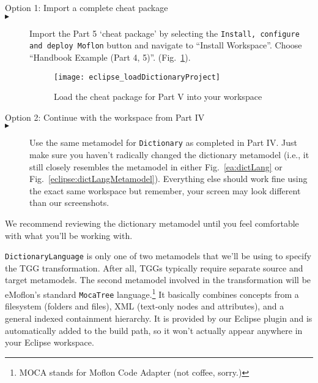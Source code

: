 \vspace{0.5cm}

\begin{description}

\item[Option 1: Import a complete cheat package]

\item[$\blacktriangleright$] \hspace{0.3cm} Import the Part 5 `cheat package' by selecting the \texttt{Install, configure and deploy Moflon} button and navigate to ``Install Workspace''. Choose ``Handbook Example (Part 4, 5)''. (Fig.~\ref{eclipse_cheatPackage}).

\begin{figure}[htbp]
\begin{center}
  \texttt{[image: eclipse\_loadDictionaryProject]}
  \caption{Load the cheat package for Part V into your workspace}
  \label{eclipse_cheatPackage}
\end{center}
\end{figure}

\vspace{0.5cm}

\item[Option 2: Continue with the workspace from Part IV]


\item[$\blacktriangleright$] \hspace{0.3cm} Use the same metamodel for \texttt{Dictionary} as completed in Part IV. Just make sure you haven't radically changed
the dictionary metamodel (i.e., it still closely resembles the metamodel in either Fig.~\ref{ea:dictLang} or Fig.~\ref{eclipse:dictLangMetamodel}). Everything
else should work fine using the exact same workspace but remember, your screen may look different than our screenshots.

\end{description}


We recommend reviewing the dictionary metamodel until you feel comfortable with what you'll be working with. 

\newpage

\texttt{DictionaryLanguage} is only one of two metamodels that we'll be using to specify the TGG transformation. After all, TGGs typically require separate
source and target metamodels. The second metamodel involved in the transformation will be eMoflon's standard \texttt{MocaTree} language.\footnote{MOCA stands
for Moflon Code Adapter (not coffee, sorry.)} It basically combines concepts from a filesystem (folders and files), XML (text-only nodes and attributes), and a
general indexed containment hierarchy. It is provided by our Eclipse plugin and is automatically added to the build path, so it won't actually appear
anywhere in your Eclipse workspace.

